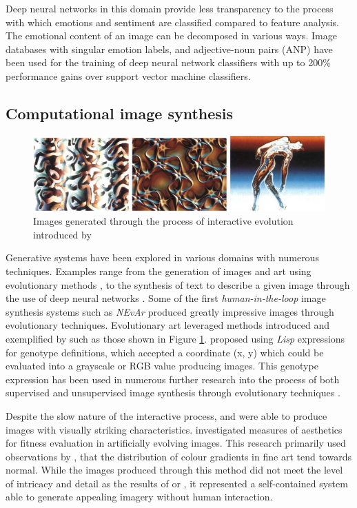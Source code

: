\documentclass{article}
\begin{document}
Deep neural networks in this domain provide less transparency to the process with which emotions and sentiment are classified compared to feature analysis.
The emotional content of an image can be decomposed in various ways.
Image databases with singular emotion labels, and adjective-noun pairs (ANP) have been used for the training of deep neural network classifiers \citep{chen2014deepsentibank, yang2018visual} with up to 200\% performance gains over support vector machine classifiers.


\subsection{Computational image synthesis}

\begin{figure}[h!]
	\includegraphics[width=\textwidth]{images/sims-interactive-image-generation.png}
	\caption{Images generated through the process of interactive evolution introduced by \citet{sims}}
	\label{fig:sims}
\end{figure}

Generative systems have been explored in various domains with numerous techniques.
Examples range from the generation of images and art using evolutionary methods \citep{sims, nevar}, to the synthesis of text to describe a given image through the use of deep neural networks \citep{mathews2016senticap}.
Some of the first \textit{human-in-the-loop} image synthesis systems such as \textit{NEvAr} \citep{nevar} produced greatly impressive images through evolutionary techniques.
Evolutionary art leveraged methods introduced and exemplified by \citet{sims} such as those shown in Figure \ref{fig:sims}.
\citet{sims} proposed using \textit{Lisp} expressions for genotype definitions, which accepted a coordinate (x, y) which could be evaluated into a grayscale or RGB value producing images.
This genotype expression has been used in numerous further research into the process of both supervised and unsupervised image synthesis through evolutionary techniques \citep{nevar, sims, den2011evolving, distributed-evolutionary-art, aesthetic-measures}.

Despite the slow nature of the interactive process, \citet{sims} and \citet{nevar} were able to produce images with visually striking characteristics.
\citet{aesthetic-measures} investigated measures of aesthetics for fitness evaluation in artificially evolving images.
This research primarily used observations by \citet{ralph-bell-curve}, that the distribution of colour gradients in fine art tend towards normal.
While the images produced through this method did not meet the level of intricacy and detail as the results of \citet{sims} or \citet{nevar}, it represented a self-contained system able to generate appealing imagery without human interaction.
\end{document}
